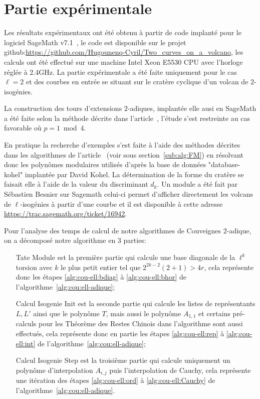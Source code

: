 \documentclass[10pt,a4paper]{book}
\theoremstyle{plain}
\theoremstyle{definition}
\theoremstyle{definition}
\theoremstyle{definition}
\theoremstyle{definition}
\theoremstyle{remark}
\theoremstyle{remark}
\theoremstyle{definition}
\begin{document}
\section{Partie expérimentale}
\label{sec:exp:cou}

Les résultats expérimentaux ont été obtenu à partir de code implanté pour le 
logiciel SageMath v7.1~\cite{Sage}, le code est disponible sur le projet 
github:\url{https://github.com/Hugounenq-Cyril/Two_curves_on_a_volcano}, les 
calculs ont été effectué sur une machine Intel Xeon E5530 CPU avec l'horloge 
réglée à 2.4GHz. La partie expérimentale a été faite uniquement pour le cas 
$\ell=2$ et des courbes en entrée se situant sur le cratère cyclique d'un 
volcan de $2$-isogénies.

La construction des tours d'extensions $2$-adiques, implantée elle ausi en 
SageMath a été faite selon la méthode
décrite dans l'article~\cite{Doliskani-Schost15}, l'étude s'est restreinte au 
cas favorable où $p=1 \bmod 4$.

En pratique la recherche d'exemples s'est faite à l'aide des méthodes décrites
dans les algorithmes de l'article~\cite{FouquetMorain02} (voir sous section~\ref{sub:alg:FM}) en résolvant donc les
polynômes modulaires utilisés d'après la base de données "database-kohel" 
implantée par David Kohel. La détermination de la forme du cratère se faisait 
elle à l'aide de la valeur du discriminant $d_k$. Un module a été fait par 
Sébastien Besnier sur Sagemath celui-ci permet d'afficher directement les 
volcans de $\ell$-isogénies à partir d'une courbe et il est disponible à cette 
adresse \url{https://trac.sagemath.org/ticket/16942}. 

Pour l'analyse des temps de calcul de notre algorithmes de Couveignes 
$2$-adique, on a décomposé notre algorithme en 3 parties:
\begin{enumerate}
\item[Tate Module] est la première partie qui calcule une base diagonale de la 
$\ell^k$ torsion avec $k$ le plus petit entier tel que $2^{2k-2}(2+1)> 4r$,
cela représente donc les étapes \ref{alg:cou-ell:bdiag} à \ref{alg:cou-ell:bhor} de l'algorithme~\ref{alg:cou:ell-adique};
\item[Calcul Isogenie Init] est la seconde partie qui calcule les listes de 
représentants $L,L'$ ainsi que le polynôme $T$, mais aussi le polynôme 
$A_{1,1}$ et certains pré-calculs pour les Théorème des Restes Chinois dans 
l'algorithme sont aussi effectués, cela représente donc en partie les étapes 
\ref{alg:cou-ell:rep} à \ref{alg:cou-ell:int} de 
l'algorithme~\ref{alg:cou:ell-adique};
\item[Calcul Isogenie Step] est la troisième partie qui calcule uniquement 
un polynôme d'interpolation $A_{i,j}$ puis l'interpolation de 
Cauchy, cela représente une itération des étapes \ref{alg:cou-ell:ord} à 
\ref{alg:cou-ell:Cauchy} de l'algorithme~\ref{alg:cou:ell-adique}.
\end{enumerate}
\end{document}
